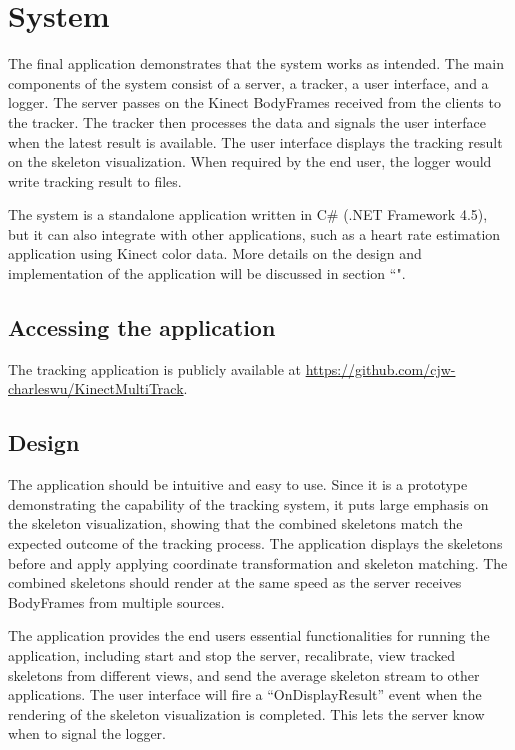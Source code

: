 \section{System}
\label{sec:system}

The final application demonstrates that the system works as intended. The main components of the system consist of a server, a tracker, a user interface, and a logger. The server passes on the Kinect BodyFrames received from the clients to the tracker. The tracker then processes the data and signals the user interface when the latest result is available. The user interface displays the tracking result on the skeleton visualization. When required by the end user, the logger would write tracking result to files.

The system is a standalone application written in C\# (.NET Framework 4.5), but it can also integrate with other applications, such as a heart rate estimation application using Kinect color data. More details on the design and implementation of the application will be discussed in section ``".

\subsection{Accessing the application}

The tracking application is publicly available at \url{https://github.com/cjw-charleswu/KinectMultiTrack}.

\subsection{Design}

The application should be intuitive and easy to use. Since it is a prototype demonstrating the capability of the tracking system, it puts large emphasis on the skeleton visualization, showing that the combined skeletons match the expected outcome of the tracking process. The application displays the skeletons before and apply applying coordinate transformation and skeleton matching. The combined skeletons should render at the same speed as the server receives BodyFrames from multiple sources. 

The application provides the end users essential functionalities for running the application, including start and stop the server, recalibrate, view tracked skeletons from different views, and send the average skeleton stream to other applications. The user interface will fire a ``OnDisplayResult'' event when the rendering of the skeleton visualization is completed. This lets the server know when to signal the logger.

